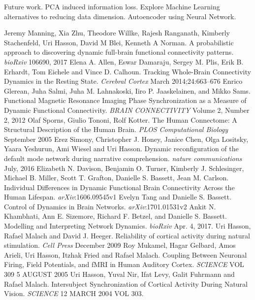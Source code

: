 \documentclass[11pt]{article}
\begin{document}
Future work. PCA induced information loss. Explore Machine Learning alternatives to reducing data dimension. Autoencoder using Neural Network.


\newpage
\begin{thebibliography}{1}
 Jeremy Manning, Xia Zhu, Theodore Willke, Rajesh Ranganath, Kimberly Stachenfeld, Uri Hasson, David M Blei, Kenneth A Norman. A probabilistic approach to discovering dynamic full-brain functional connectivity patterns. \textit{bioRxiv} 106690, 2017
 Elena A. Allen, Eswar Damaraju, Sergey M. Plis, Erik B. Erhardt, Tom Eichele and Vince D. Calhoun. Tracking Whole-Brain Connectivity Dynamics in the Resting State. \textit{Cerebral Cortex} March 2014;24:663–676
 Enrico Glerean, Juha Salmi, Juha M. Lahnakoski, Iiro P. Jaaskelainen, and Mikko Sams. Functional Magnetic Resonance Imaging Phase Synchronization as a Measure of Dynamic Functional Connectivity. \textit{BRAIN CONNECTIVITY} Volume 2, Number 2, 2012
 Olaf Sporns, Giulio Tononi, Rolf Kotter. The Human Connectome: A Structural Description of the Human Brain. \textit{PLOS Computational Biology} September 2005
 Erez Simony, Christopher J. Honey, Janice Chen, Olga Lositsky, Yaara Yeshurun, Ami Wiesel and Uri Hasson. Dynamic reconfiguration of the default mode network during narrative comprehension. \textit{nature communications} July, 2016
 Elizabeth N. Davison, Benjamin O. Turner, Kimberly J. Schlesinger, Michael B. Miller, Scott T. Grafton, Danielle S. Bassett, Jean M. Carlson. Individual Differences in Dynamic Functional Brain Connectivity Across the Human Lifespan. \textit{arXiv}:1606.09545v1
 Evelyn Tang and Danielle S. Bassett. Control of Dynamics in Brain Networks. \textit{arXiv}:1701.01531v2
 Ankit N. Khambhati, Ann E. Sizemore, Richard F. Betzel, and Danielle S. Bassett. Modelling and Interpreting Network Dynamics. \textit{bioRxiv} Apr. 4, 2017.
 Uri Hasson, Rafael Malach and David J. Heeger. Reliability of cortical activity during natural stimulation. \textit{Cell Press} December 2009
 Roy Mukamel, Hagar Gelbard, Amos Arieli, Uri Hasson, Itzhak Fried and Rafael Malach. Coupling Between Neuronal Firing, Field Potentials, and fMRI in Human Auditory Cortex. \textit{SCIENCE} VOL 309 5 AUGUST 2005
 Uri Hasson, Yuval Nir, Ifat Levy, Galit Fuhrmann and Rafael Malach. Intersubject Synchronization of Cortical Activity During Natural Vision. \textit{SCIENCE} 12 MARCH 2004 VOL 303.

\end{thebibliography}
\end{document}

